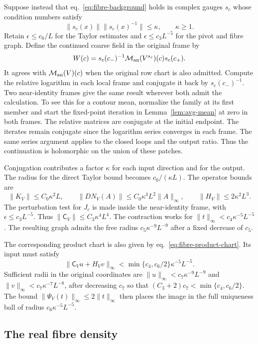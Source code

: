 \documentclass[11pt,letterpaper,reqno]{amsart}
\numberwithin{equation}{section}
\renewcommand{\eqref}[1]{\textup{eq.~\ref{#1}}}
\theoremstyle{definition}
\theoremstyle{remark}
\begin{document}
Suppose instead that \eqref{eq:fibre-background} holds in complex
gauges $s_c$ whose condition numbers satisfy
\[
 \|s_c(x)\|\|s_c(x)^{-1}\|\le\kappa,\qquad \kappa\ge1.
\]
Retain \(\epsilon\le c_0/L\) for the Taylor estimates and
\(\epsilon\le c_3L^{-5}\) for the pivot and fibre graph.
Define the continued coarse field in the original frame by
\[
 W(c)=s_c(c_-)^{-1}\mathcal M_{\rm an}(V^{s_c})(c)s_c(c_+).
\]
It agrees with \(\mathcal M_{\rm an}(V)(c)\) when the original row
chart is also admitted. Compute the relative logarithm in each local
frame and conjugate it back by \(s_c(c_-)^{-1}\).
Two near-identity frames give the same result
wherever both admit the calculation. To see this for a contour mean, normalize
the family at its first member and start the fixed-point iteration in
Lemma~\ref{lem:avg-mean} at zero in both frames. The relative matrices are
conjugate at the initial endpoint. The iterates remain conjugate since the
logarithm series converges in each frame. The same series argument applies to
the closed loops and the output ratio. Thus the continuation is holomorphic on
the union of these patches.

Conjugation contributes a factor $\kappa$ for each input direction and for the
output. The radius for the direct Taylor bound becomes $c_0/(\kappa L)$. The
operator bounds are
\[
 \|K_V\|\le C_0\kappa^2 L,\qquad
 \|DN_V(A)\|\le C_0\kappa^3 L^2\|A\|_\infty,\qquad
 \|H_V\|\le2\kappa^2L^3.
\]
The perturbation test for $J_c$ is made inside the near-identity frame, with
$\epsilon\le c_3L^{-5}$. Thus $\|\mathsf C_V\|\le C_3\kappa^4L^4$. The
contraction works for $\|t\|_\infty<c_4\kappa^{-5}L^{-5}$. The resulting graph
admits the free radius $c_5\kappa^{-9}L^{-9}$ after a fixed decrease of $c_5$.

The corresponding product chart is also given by
\eqref{eq:fibre-product-chart}. Its input must satisfy
\[
 \|\mathsf C_Vu+H_Vv\|_\infty
       <\min\{c_4,c_6/2\}\kappa^{-5}L^{-5}.
\]
Sufficient radii in the original coordinates are
\(\|u\|_\infty<c_7\kappa^{-9}L^{-9}\) and
\(\|v\|_\infty<c_7\kappa^{-7}L^{-8}\), after decreasing
\(c_7\) so that \((C_3+2)c_7<\min\{c_4,c_6/2\}\).
The bound \(\|\Psi_V(t)\|_\infty\le2\|t\|_\infty\)
then places the image in the full uniqueness ball of radius
\(c_6\kappa^{-5}L^{-5}\).

\subsection{The real fibre density}\label{sec:fibre-measure}
\end{document}
